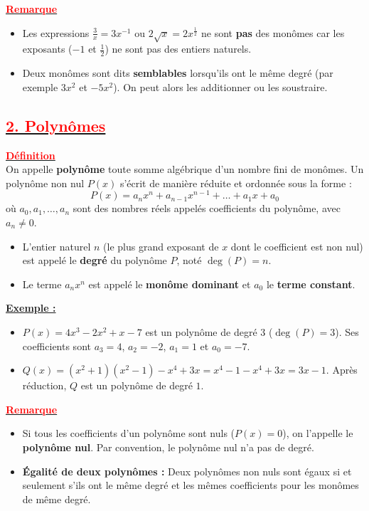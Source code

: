 \documentclass[12pt,a4paper]{article}
\newcounter{exemple}
\newcommand{\exemple}{%
  \refstepcounter{exemple}%
  \textbf{\textcolor{green!60!black}{Exemple \theexemple :}} \ignorespaces
}
\begin{document}
\medskip
\underline{\textbf{\textcolor{red}{Remarque}}}
\begin{itemize}[label=]
    \item Les expressions $\frac{3}{x} = 3x^{-1}$ ou $2\sqrt{x} = 2x^{\frac{1}{2}}$ ne sont \textbf{pas} des monômes car les exposants ($-1$ et $\frac{1}{2}$) ne sont pas des entiers naturels.
    \item Deux monômes sont dits \textbf{semblables} lorsqu'ils ont le même degré (par exemple $3x^2$ et $-5x^2$). On peut alors les additionner ou les soustraire.
\end{itemize}

\subsection*{\underline{\textbf{\textcolor{red}{2. Polynômes}}}} 
\underline{\textbf{\textcolor{red}{Définition}}} \\
On appelle \textbf{polynôme} toute somme algébrique d'un nombre fini de monômes. Un polynôme non nul $P(x)$ s'écrit de manière réduite et ordonnée sous la forme :
$$P(x) = a_n x^n + a_{n-1} x^{n-1} + \dots + a_1 x + a_0$$
où $a_0, a_1, \dots, a_n$ sont des nombres réels appelés coefficients du polynôme, avec $a_n \neq 0$.
\begin{itemize}[label=]
    \item L'entier naturel $n$ (le plus grand exposant de $x$ dont le coefficient est non nul) est appelé le \textbf{degré} du polynôme $P$, noté $\deg(P) = n$.
    \item Le terme $a_n x^n$ est appelé le \textbf{monôme dominant} et $a_0$ le \textbf{terme constant}.
\end{itemize}

\medskip
\underline{\exemple}
\begin{itemize}[label=]
    \item $P(x) = 4x^3 - 2x^2 + x - 7$ est un polynôme de degré $3$ ($\deg(P) = 3$). Ses coefficients sont $a_3 = 4$, $a_2 = -2$, $a_1 = 1$ et $a_0 = -7$.
    \item $Q(x) = (x^2 + 1)(x^2 - 1) - x^4 + 3x = x^4 - 1 - x^4 + 3x = 3x - 1$. Après réduction, $Q$ est un polynôme de degré $1$.
\end{itemize}

\medskip
\underline{\textbf{\textcolor{red}{Remarque}}}
\begin{itemize}[label=]
    \item Si tous les coefficients d'un polynôme sont nuls ($P(x) = 0$), on l'appelle le \textbf{polynôme nul}. Par convention, le polynôme nul n'a pas de degré.
    \item \textbf{Égalité de deux polynômes :} Deux polynômes non nuls sont égaux si et seulement s'ils ont le même degré et les mêmes coefficients pour les monômes de même degré.
\end{itemize}
\end{document}
